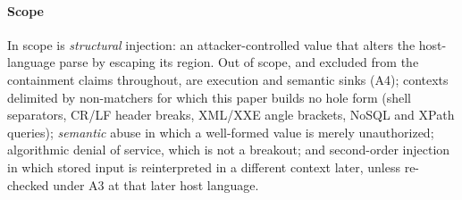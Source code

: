 \paragraph{Scope}
In scope is \emph{structural} injection: an attacker-controlled value that
alters the host-language parse by escaping its region.
Out of scope, and excluded from the containment claims throughout, are execution
and semantic sinks (A4); contexts delimited by non-matchers for which this paper
builds no hole form (shell separators, CR/LF header breaks, XML/XXE angle brackets,
NoSQL and XPath queries);
\emph{semantic} abuse in which a well-formed value is merely unauthorized;
algorithmic denial of service, which is not a breakout; and second-order
injection in which stored input is reinterpreted in a different context later,
unless re-checked under A3 at that later host language.
